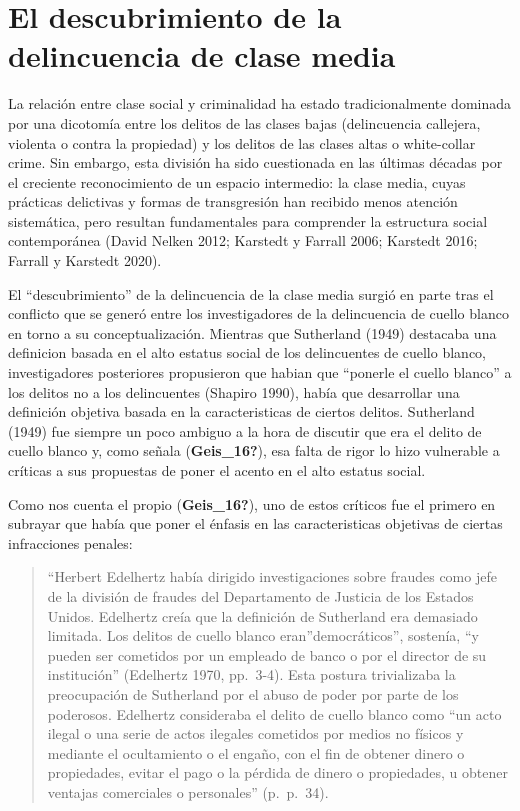 \documentclass[
  spanish,
  letterpaper,
  DIV=11,
  numbers=noendperiod]{scrreprt}
\begin{document}
\section{El descubrimiento de la delincuencia de clase
media}\label{el-descubrimiento-de-la-delincuencia-de-clase-media}

La relación entre clase social y criminalidad ha estado tradicionalmente
dominada por una dicotomía entre los delitos de las clases bajas
(delincuencia callejera, violenta o contra la propiedad) y los delitos
de las clases altas o white-collar crime. Sin embargo, esta división ha
sido cuestionada en las últimas décadas por el creciente reconocimiento
de un espacio intermedio: la clase media, cuyas prácticas delictivas y
formas de transgresión han recibido menos atención sistemática, pero
resultan fundamentales para comprender la estructura social
contemporánea (David Nelken 2012; Karstedt y Farrall 2006; Karstedt
2016; Farrall y Karstedt 2020).

El ``descubrimiento'' de la delincuencia de la clase media surgió en
parte tras el conflicto que se generó entre los investigadores de la
delincuencia de cuello blanco en torno a su conceptualización. Mientras
que Sutherland (1949) destacaba una definicion basada en el alto estatus
social de los delincuentes de cuello blanco, investigadores posteriores
propusieron que habian que ``ponerle el cuello blanco'' a los delitos no
a los delincuentes (Shapiro 1990), había que desarrollar una definición
objetiva basada en la caracteristicas de ciertos delitos. Sutherland
(1949) fue siempre un poco ambiguo a la hora de discutir que era el
delito de cuello blanco y, como señala (\textbf{Geis\_16?}), esa falta
de rigor lo hizo vulnerable a críticas a sus propuestas de poner el
acento en el alto estatus social.

Como nos cuenta el propio (\textbf{Geis\_16?}), uno de estos críticos
fue el primero en subrayar que había que poner el énfasis en las
caracteristicas objetivas de ciertas infracciones penales:

\begin{quote}
``Herbert Edelhertz había dirigido investigaciones sobre fraudes como
jefe de la división de fraudes del Departamento de Justicia de los
Estados Unidos. Edelhertz creía que la definición de Sutherland era
demasiado limitada. Los delitos de cuello blanco eran''democráticos'',
sostenía, ``y pueden ser cometidos por un empleado de banco o por el
director de su institución'' (Edelhertz 1970, pp.~3-4). Esta postura
trivializaba la preocupación de Sutherland por el abuso de poder por
parte de los poderosos. Edelhertz consideraba el delito de cuello blanco
como ``un acto ilegal o una serie de actos ilegales cometidos por medios
no físicos y mediante el ocultamiento o el engaño, con el fin de obtener
dinero o propiedades, evitar el pago o la pérdida de dinero o
propiedades, u obtener ventajas comerciales o personales'' (p.~p.~34).
\end{quote}
\end{document}
